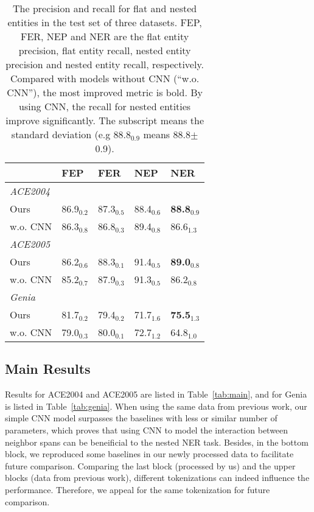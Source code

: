 \documentclass[11pt]{article}
\begin{document}
\begin{table}[!th]
  \centering
  \small
  \setlength{\tabcolsep}{3pt}
  \begin{tabular}{@{}lllll@{}}
    \toprule
                         & FEP            & FER            & NEP            & NER            \\
                          \midrule
                          \textit{ACE2004}     \\                    
                Ours     & 86.9$_{0.2}$& 87.3$_{0.5}$  & 88.4$_{0.6}$ & \textbf{88.8}$_{0.9}$ \\
         \quad  w.o. CNN & 86.3$_{0.8}$& 86.8$_{0.3}$ & 89.4$_{0.8}$   & 86.6$_{1.3}$\\
                           \midrule
                           \textit{ACE2005} \\
                Ours      & 86.2$_{0.6}$ & 88.3$_{0.1}$  & 91.4$_{0.5}$ & \textbf{89.0}$_{0.8}$ \\
          \quad  w.o. CNN & 85.2$_{0.7}$ & 87.9$_{0.3}$ & 91.3$_{0.5}$ & 86.2$_{0.8}$ \\
                           \midrule
                           \textit{Genia} \\
Ours     & 81.7$_{0.2}$ & 79.4$_{0.2}$  & 71.7$_{1.6}$ & \textbf{75.5}$_{1.3}$\\
          \quad  w.o. CNN & 79.0$_{0.3}$ & 80.0$_{0.1}$ & 72.7$_{1.2}$  & 64.8$_{1.0}$  \\
          \bottomrule
  \end{tabular}
  \caption{The precision and recall for flat and nested entities in the test set of three datasets. FEP, FER, NEP and NER are the flat entity precision, flat entity recall, nested entity precision and nested entity recall, respectively. Compared with models without CNN (``w.o. CNN''), the most improved metric is bold. By using CNN, the recall for nested entities improve significantly. The subscript means the standard deviation (e.g 88.8$_{0.9}$ means 88.8$\pm$0.9).}
  \label{tab:why_cnn}
\end{table}

\subsection{Main Results}
Results for ACE2004 and ACE2005 are listed in Table~\ref{tab:main}, and for Genia is listed in Table~\ref{tab:genia}. When using the same data from previous work, our simple CNN model surpasses the baselines with less or similar number of parameters, which proves that using CNN to model the interaction between neighbor spans can be beneificial to the nested NER task. Besides, in the bottom block, we reproduced some baselines in our newly processed data to facilitate future comparison. Comparing the last block (processed by us) and the upper blocks (data from previous work), different tokenizations can indeed influence the performance. Therefore, we appeal for the same tokenization for future comparison.
\end{document}
